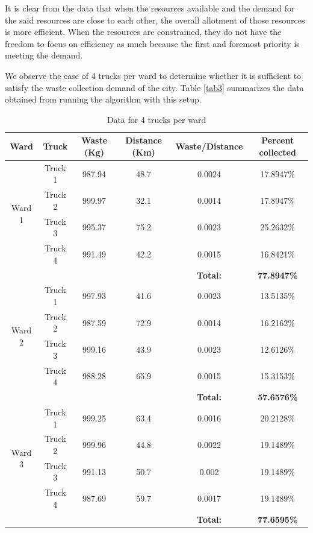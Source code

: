 \documentclass[12pt]{article}
\begin{document}
It is clear from the data that when the resources available and the demand for the said resources are close to each other, the overall allotment of those resources is more efficient. When the resources are constrained, they do not have the freedom to focus on efficiency as much because the first and foremost priority is meeting the demand.

We observe the case of 4 trucks per ward to determine whether it is sufficient to satisfy the waste collection demand of the city. Table \ref{tab3} summarizes the data obtained from running the algorithm with this setup.
\begin{table}[H]
    \centering
    \caption{ Data for 4 trucks per ward} \label{tab2}
    \vspace*{0.3cm}
    \begin{tabular}{|c|c|c|c|c|c|}
        \hline Ward & Truck & Waste (Kg) & Distance (Km) & Waste/Distance & Percent collected \\
        \hline \multirow{4}{*}{Ward 1} & Truck 1 & 987.94& 48.7 &0.0024  &17.8947\% \\
        \cline{2-6}& Truck 2 &999.97&32.1&0.0014&17.8947\%\\        
        \cline{2-6}& Truck 3 &995.37&75.2&0.0023&25.2632\%\\        
        \cline{2-6}& Truck 4 &991.49&42.2&0.0015&16.8421\%\\
        \hline & & & &\textbf{Total:} &\textbf{77.8947\%}\\
        \hline \multirow{4}{*}{Ward 2} & Truck 1 &997.93 &41.6  & 0.0023  &13.5135\% \\
        \cline{2-6}& Truck 2 &987.59&72.9&0.0014&16.2162\%\\        
        \cline{2-6}& Truck 3 &999.16&43.9&0.0023&12.6126\%\\        
        \cline{2-6}& Truck 4 &988.28&65.9&0.0015&15.3153\%\\
        \hline & & & &\textbf{Total:} &\textbf{57.6576\%}\\     
        \hline \multirow{4}{*}{Ward 3} & Truck 1 &999.25  &63.4  &0.0016  &20.2128\% \\
        \cline{2-6}& Truck 2 &999.96&44.8&0.0022&19.1489\%\\        
        \cline{2-6}& Truck 3 &991.13&50.7&0.002&19.1489\%\\        
        \cline{2-6}& Truck 4 &987.69&59.7&0.0017&19.1489\%\\
        \hline & & & &\textbf{Total:} &\textbf{77.6595\%}\\
        \hline      
    \end{tabular}
\end{table}
\end{document}
